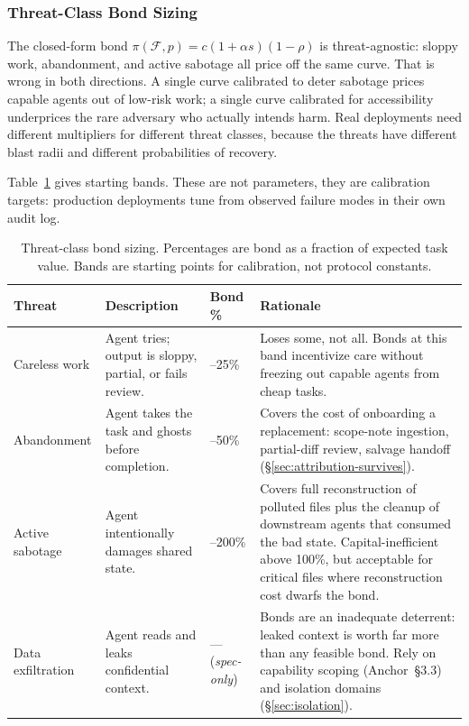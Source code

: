 \documentclass[11pt,a4paper]{article}
\newcommand{\SpecOnly}{{\textcolor{hhgray}{\textit{spec-only}}}}
\theoremstyle{definition}
\theoremstyle{remark}
\begin{document}
\subsubsection{Threat-Class Bond Sizing}\label{sec:pricing:threats}

The closed-form bond $\pi(\mathcal{F}, p) = c(1 + \alpha s)(1 - \rho)$ is threat-agnostic: sloppy work, abandonment, and active sabotage all price off the same curve. That is wrong in both directions. A single curve calibrated to deter sabotage prices capable agents out of low-risk work; a single curve calibrated for accessibility underprices the rare adversary who actually intends harm. Real deployments need different multipliers for different threat classes, because the threats have different blast radii and different probabilities of recovery.

Table~\ref{tab:threat-bonds} gives starting bands. These are not parameters, they are calibration targets: production deployments tune from observed failure modes in their own audit log.

\begin{table}[H]
\centering
\caption{Threat-class bond sizing. Percentages are bond as a fraction of expected task value. Bands are starting points for calibration, not protocol constants.}
\label{tab:threat-bonds}
\begin{tabular}{@{}>{\raggedright\arraybackslash}p{2.6cm}>{\raggedright\arraybackslash}p{4.2cm}>{\raggedright\arraybackslash}p{1.7cm}>{\raggedright\arraybackslash}p{4.8cm}@{}}
\toprule
\textbf{Threat} & \textbf{Description} & \textbf{Bond \%} & \textbf{Rationale} \\
\midrule
Careless work & Agent tries; output is sloppy, partial, or fails review. & 10--25\% & Loses some, not all. Bonds at this band incentivize care without freezing out capable agents from cheap tasks. \\
Abandonment & Agent takes the task and ghosts before completion. & 25--50\% & Covers the cost of onboarding a replacement: scope-note ingestion, partial-diff review, salvage handoff (\S\ref{sec:attribution-survives}). \\
Active sabotage & Agent intentionally damages shared state. & 100--200\% & Covers full reconstruction of polluted files plus the cleanup of downstream agents that consumed the bad state. Capital-inefficient above 100\%, but acceptable for critical files where reconstruction cost dwarfs the bond. \\
Data exfiltration & Agent reads and leaks confidential context. & --- (\SpecOnly) & Bonds are an inadequate deterrent: leaked context is worth far more than any feasible bond. Rely on capability scoping (Anchor~\S3.3) and isolation domains (\S\ref{sec:isolation}). \\
\bottomrule
\end{tabular}
\end{table}
\end{document}

